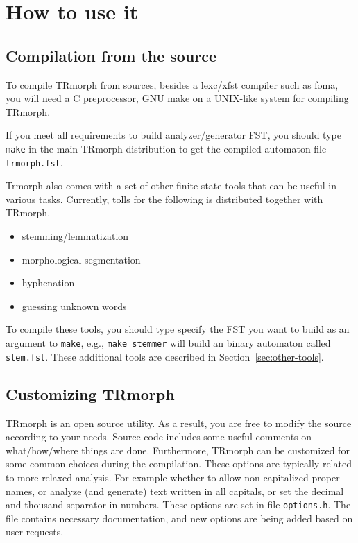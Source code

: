 \documentclass[twocolumn]{article}
\begin{document}
\section{How to use it}

\subsection{Compilation from the source}

To compile TRmorph from sources, besides a lexc/xfst compiler such as
foma, you will need a C preprocessor, GNU make on a UNIX-like system
for compiling TRmorph.

If you meet all requirements to build analyzer/generator FST, you
should type \lstinline{make} in the main TRmorph distribution to get
the compiled automaton file \lstinline{trmorph.fst}.

Trmorph also comes with a set of other finite-state tools that can be
useful in various tasks. Currently, tolls for the following is
distributed together with TRmorph.

\begin{itemize}
\item stemming/lemmatization
\item morphological segmentation
\item hyphenation
\item guessing unknown words
\end{itemize}

To compile these tools, you should type specify the FST you want to
build as an argument to \lstinline{make}, e.g., 
\lstinline{make stemmer} 
will build an binary automaton called \lstinline{stem.fst}.
These additional tools are described in Section~\ref{sec:other-tools}.

\subsection{Customizing TRmorph}

TRmorph is an open source utility. As a result, you are free to modify
the source according to your needs. Source code includes some useful
comments on what/how/where things are done. Furthermore, TRmorph can
be customized for some common choices during the compilation. These
options are typically related to more relaxed analysis. For example
whether to allow non-capitalized proper names, or analyze (and
generate) text written in all capitals, or set the decimal and
thousand separator in numbers. These options are set in file
\lstinline{options.h}. The file contains necessary documentation, and
new options are being added based on user requests.
\end{document}
